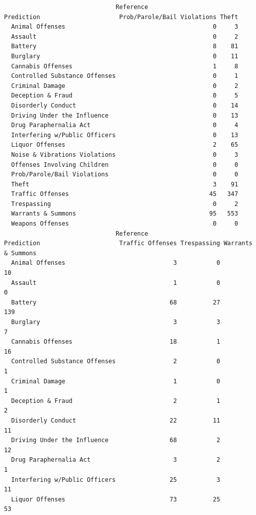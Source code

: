 \documentclass[
  article]{jss}
\begin{document}
\begin{verbatim}
                               Reference
Prediction                      Prob/Parole/Bail Violations Theft
  Animal Offenses                                         0     3
  Assault                                                 0     2
  Battery                                                 8    81
  Burglary                                                0    11
  Cannabis Offenses                                       1     8
  Controlled Substance Offenses                           0     1
  Criminal Damage                                         0     2
  Deception & Fraud                                       0     5
  Disorderly Conduct                                      0    14
  Driving Under the Influence                             0    13
  Drug Paraphernalia Act                                  0     4
  Interfering w/Public Officers                           0    13
  Liquor Offenses                                         2    65
  Noise & Vibrations Violations                           0     3
  Offenses Involving Children                             0     0
  Prob/Parole/Bail Violations                             0     0
  Theft                                                   3    91
  Traffic Offenses                                       45   347
  Trespassing                                             0     2
  Warrants & Summons                                     95   553
  Weapons Offenses                                        0     0
                               Reference
Prediction                      Traffic Offenses Trespassing Warrants & Summons
  Animal Offenses                              3           0                 10
  Assault                                      1           0                  0
  Battery                                     68          27                139
  Burglary                                     3           3                  7
  Cannabis Offenses                           18           1                 16
  Controlled Substance Offenses                2           0                  1
  Criminal Damage                              1           0                  1
  Deception & Fraud                            2           1                  2
  Disorderly Conduct                          22          11                 11
  Driving Under the Influence                 68           2                 12
  Drug Paraphernalia Act                       3           2                  1
  Interfering w/Public Officers               25           3                 11
  Liquor Offenses                             73          25                 53

\end{verbatim}
\end{document}
